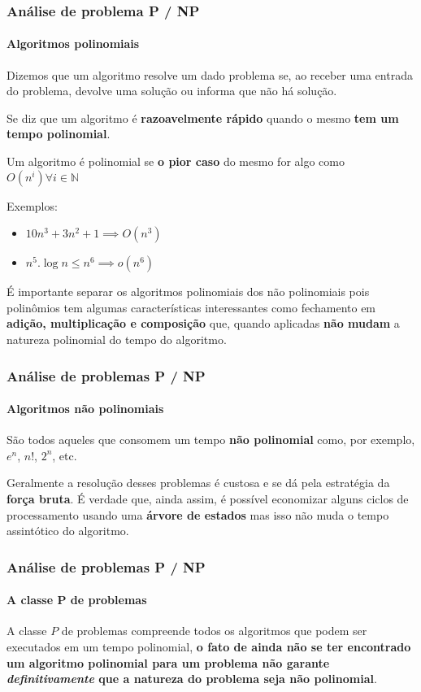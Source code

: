 \begin{frame}
	\frametitle{Análise de problema P / NP}
	\framesubtitle{Algoritmos polinomiais}
	\par Dizemos que um algoritmo resolve um dado problema se, ao receber uma entrada do problema, devolve uma solução ou informa que não há solução.
	\par Se diz que um algoritmo é \textbf{razoavelmente rápido} quando o mesmo \textbf{tem um tempo polinomial}.
	\par Um algoritmo é polinomial se \textbf{o pior caso} do mesmo for algo como $O(n^i) \forall i \in  \mathbb{N}$
	\par Exemplos:
	\begin{itemize}
		\item $10n^3+3n^2+1 \implies O(n^3)$
		\item $n^5.\log n \leq n^6 \implies o(n^6)$
	\end{itemize}
	\par É importante separar os algoritmos polinomiais dos não polinomiais pois polinômios tem algumas características interessantes como fechamento em \textbf{adição, multiplicação e composição} que, quando aplicadas \textbf{não mudam} a natureza polinomial do tempo do algoritmo.
\end{frame}

\begin{frame}
	\frametitle{Análise de problemas P / NP}
	\framesubtitle{Algoritmos \textbf{não} polinomiais}
	\par São todos aqueles que consomem um tempo \textbf{não polinomial} como, por exemplo, $e^n$, $n!$, $2^n$, etc.
	\par Geralmente a resolução desses problemas é custosa e se dá pela estratégia da \textbf{força bruta}. É verdade que, ainda assim, é possível economizar alguns ciclos de processamento usando uma \textbf{árvore de estados} mas isso não muda o tempo assintótico do algoritmo.
\end{frame}

\begin{frame}
	\frametitle{Análise de problemas P / NP}
	\framesubtitle{A classe P de problemas}
	\par A classe $P$ de problemas compreende todos os algoritmos que podem ser executados em um tempo polinomial, \textbf{o fato de ainda não se ter encontrado um algoritmo polinomial para um problema não garante \textit{definitivamente} que a natureza do problema seja não polinomial}.
\end{frame}

